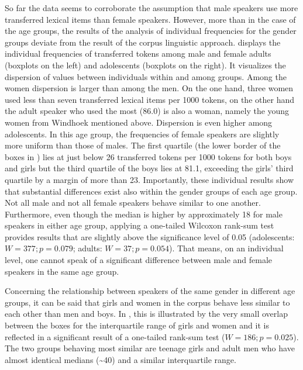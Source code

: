 \documentclass[output=paper]{langsci/langscibook}
\begin{document}
So far the data seems to corroborate the assumption that male speakers use more transferred lexical items than female speakers. However, more than in the case of the age groups, the results of the analysis of individual frequencies for the gender groups deviate from the result of the corpus linguistic approach.  displays the individual frequencies of transferred tokens among male and female adults (boxplots on the left) and adolescents (boxplots on the right). It visualizes the dispersion of values between individuals within and among groups. Among the women dispersion is larger than among the men. On the one hand, three women used less than seven transferred lexical items per 1000 tokens, on the other hand the adult speaker who used the most (86.0) is also a woman, namely the young women from Windhoek mentioned above. Dispersion is even higher among adolescents. In this age group, the frequencies of female speakers are slightly more uniform than those of males. The first quartile (the lower border of the boxes in ) lies at just below 26 transferred tokens per 1000 tokens for both boys and girls but the third quartile of the boys lies at 81.1, exceeding the girls’ third quartile by a margin of more than 23. Importantly, these individual results show that substantial differences exist also within the gender groups of each age group. Not all male and not all female speakers behave similar to one another. Furthermore, even though the median is higher by approximately 18 for male speakers in either age group, applying a one-tailed Wilcoxon rank-sum test provides results that are slightly above the significance level of 0.05 (adolescents: $W = 377; p = 0.079$; adults: $W = 37; p = 0.054$). That means, on an individual level, one cannot speak of a significant difference between male and female speakers in the same age group.

Concerning the relationship between speakers of the same gender in different age groups, it can be said that girls and women in the corpus behave less similar to each other than men and boys. In , this is illustrated by the very small overlap between the boxes for the interquartile range of girls and women and it is reflected in a significant result of a one-tailed rank-sum test ($W = 186; p = 0.025$). The two groups behaving most similar are teenage girls and adult men who have almost identical medians ({\textasciitilde}40) and a similar interquartile range.\largerpage[-1]
\end{document}
